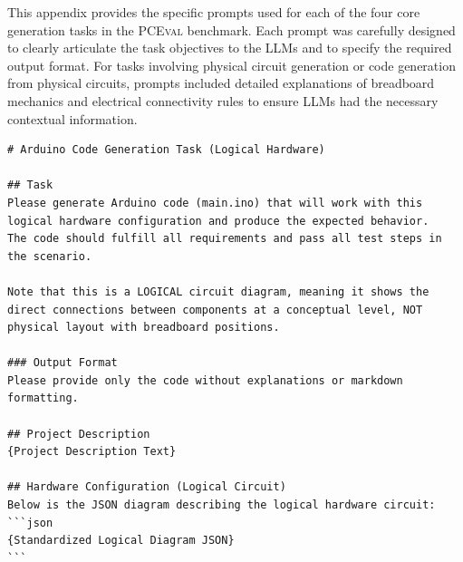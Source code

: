 \documentclass{article} %
\newlength{\promptboxmargin}
\begin{document}
This appendix provides the specific prompts used for each of the four core generation tasks in the \textsc{PCEval} benchmark. Each prompt was carefully designed to clearly articulate the task objectives to the LLMs and to specify the required output format.
For tasks involving physical circuit generation or code generation from physical circuits, prompts included detailed explanations of breadboard mechanics and electrical connectivity rules to ensure LLMs had the necessary contextual information.

\begin{adjustwidth}{\promptboxmargin}{\promptboxmargin}
\begin{lstlisting}[style=promptstyle, caption={Code Generation Task (Logical Hardware)}, basicstyle=\ttfamily\footnotesize]
# Arduino Code Generation Task (Logical Hardware)

## Task
Please generate Arduino code (main.ino) that will work with this logical hardware configuration and produce the expected behavior.
The code should fulfill all requirements and pass all test steps in the scenario.

Note that this is a LOGICAL circuit diagram, meaning it shows the direct connections between components at a conceptual level, NOT physical layout with breadboard positions.

### Output Format
Please provide only the code without explanations or markdown formatting.

## Project Description
{Project Description Text}

## Hardware Configuration (Logical Circuit)
Below is the JSON diagram describing the logical hardware circuit:
```json
{Standardized Logical Diagram JSON}
```
\end{lstlisting}
\end{adjustwidth}
\end{document}
